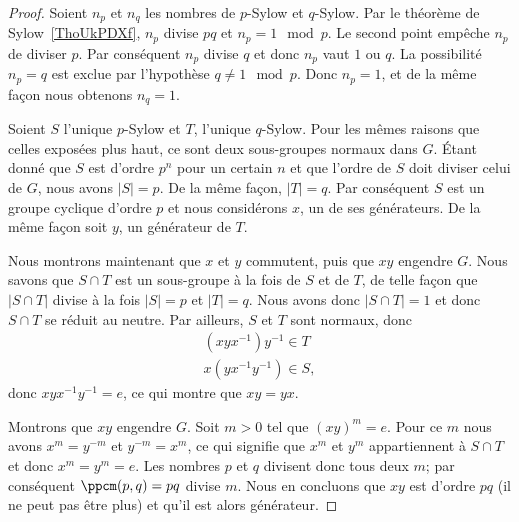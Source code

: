 \begin{proof}
	Soient \( n_p\) et \( n_q\) les nombres de \( p\)-Sylow et \( q\)-Sylow. Par le théorème de Sylow~\ref{ThoUkPDXf}, \( n_p\) divise \( pq\) et \( n_p=1\mod p\). Le second point empêche \( n_p\) de diviser \( p\). Par conséquent \( n_p\) divise \( q\) et donc \( n_p\) vaut \( 1\) ou \( q\). La possibilité \( n_p=q\) est exclue par l'hypothèse \( q\neq 1\mod p\). Donc \( n_p=1\), et de la même façon nous obtenons \( n_q=1\).

	Soient \( S\) l'unique \( p\)-Sylow et \( T\), l'unique \( q\)-Sylow. Pour les mêmes raisons que celles exposées plus haut, ce sont deux sous-groupes normaux dans \( G\). Étant donné que \( S\) est d'ordre \( p^n\) pour un certain \( n\) et que l'ordre de \( S\) doit diviser celui de \( G\), nous avons \( |S|=p\). De la même façon, \( | T |=q\). Par conséquent \( S\) est un groupe cyclique d'ordre \( p\) et nous considérons \( x\), un de ses générateurs. De la même façon soit \( y\), un générateur de \( T\).

	Nous montrons maintenant que \( x\) et \( y\) commutent, puis que \( xy\) engendre \( G\). Nous savons que \( S\cap T\) est un sous-groupe à la fois de \( S\) et de \( T\), de telle façon que \( | S\cap T |\) divise à la fois \( | S |=p\) et \( | T |=q\). Nous avons donc \( | S\cap T |=1\) et donc \( S\cap T\) se réduit au neutre. Par ailleurs, \( S\) et \( T\) sont normaux, donc
	\begin{subequations}
		\begin{align}
			(xyx^{-1})y^{-1}\in T \\
        x(yx^{-1}y^{-1})\in S,
		\end{align}
	\end{subequations}
	donc \( xyx^{-1}y^{-1}=e\), ce qui montre que \( xy=yx\).

	Montrons que \( xy\) engendre \( G\). Soit \( m>0\) tel que \( (xy)^m=e\). Pour ce \( m\) nous avons \( x^m=y^{-m}\) et \( y^{-m}=x^m\), ce qui signifie que \( x^m\) et \( y^m\) appartiennent à \( S\cap T\) et donc \( x^m=y^m=e\). Les nombres \( p\) et \( q\) divisent donc tous deux \( m\); par conséquent \( \ppcm(p,q)=pq\) divise \( m\). Nous en concluons que \( xy\) est d'ordre \( pq\) (il ne peut pas être plus) et qu'il est alors générateur.


\end{proof}
